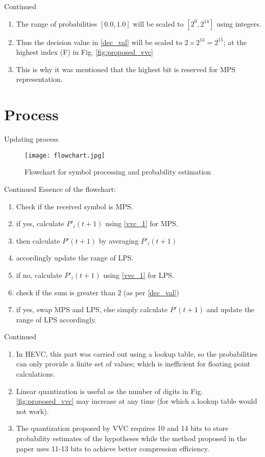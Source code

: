 \documentclass{beamer}
\begin{document}
\begin{frame}{Continued}
\begin{enumerate}[]
\item The range of probabilities $[0.0, 1.0]$ will be scaled to $[2^0, 2^{14}]$ using integers. 
\item Thus the decision value in \eqref{dec_val} will be scaled to $2\times2^{14}=2^{15}$; at the highest index (F) in Fig. \ref{fig:proposed_vvc} 
\item This is why it was mentioned that the highest bit is reserved for MPS representation.
\end{enumerate}    
\end{frame}
\section{Process}
\begin{frame}{Updating process}
    \begin{figure}
        \centering
        \texttt{[image: flowchart.jpg]}
        \caption{Flowchart for symbol processing and probability estimation}
        \label{fig:flow}
    \end{figure}
\end{frame}
\begin{frame}{Continued}
    Essence of the flowchart:
    \begin{enumerate}
        \item Check if the received symbol is MPS.
        \item if yes, calculate $P'_i(t+1)$ using \eqref{vvc_1} for MPS.
        \item then calculate $P'(t+1)$ by averaging $P'_i(t+1)$
        \item accordingly update the range of LPS.
        \item if no, calculate $P'_i(t+1)$ using \eqref{vvc_1} for LPS.
        \item check if the sum is greater than $2$ (as per \eqref{dec_val})
        \item if yes, swap MPS and LPS, else simply calculate $P'(t+1)$ and update the range of LPS accordingly.
    \end{enumerate}
\end{frame}

\begin{frame}{Continued}
\begin{enumerate}[]
        \item In HEVC, this part was carried out using a lookup table,  so the probabilities can only provide a finite set of values; which is inefficient for floating point calculations. 
        \item Linear quantization is useful as the number of digits in Fig. \ref{fig:proposed_vvc} may increase at any time (for which a lookup table would not work). 
        \item The quantization proposed by VVC requires 10 and 14 bits to store probability estimates of the hypotheses while the method proposed in the paper uses 11-13 bits to achieve better compression efficiency. 
\end{enumerate}
\end{frame}
\end{document}
